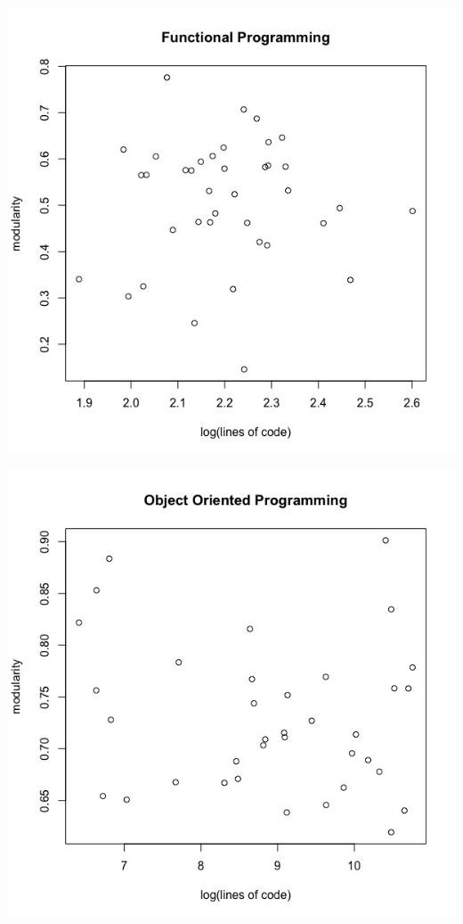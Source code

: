\documentclass[12pt, a4paper]{article}
\begin{document}
\begin{minipage}[t]{\linewidth}
    \includegraphics[width=\textwidth]{images/fp_lines_code_vs_modularity.jpeg}
    \captionsetup{type=figure}
    \label{fig:fp_log_lines_mod}
  \end{minipage}
  
  \begin{minipage}[t]{\linewidth}
    \includegraphics[width=\textwidth]{images/oop_lines_code_vs_modularity.jpeg}
    \captionsetup{type=figure}
    \label{fig:oop_log_lines_mod}
  \end{minipage}
\end{document}
